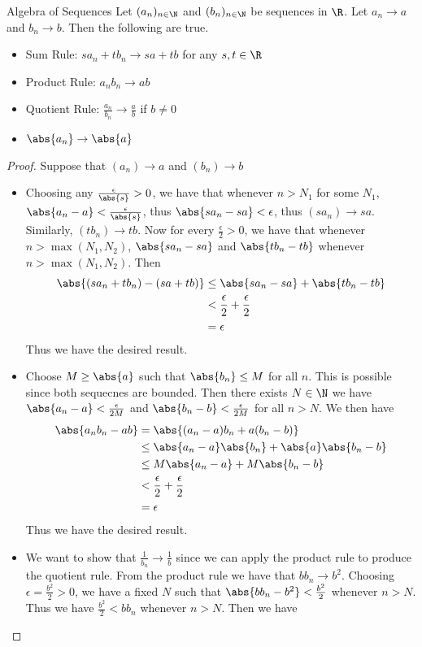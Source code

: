 \begin{prp}{Algebra of Sequences}{} Let $(a_n)_{n\in\N}$ and $(b_n)_{n\in\N}$ be sequences in $\R$. Let $a_n\to a$ and $b_n\to b$. Then the following are true. 
\begin{itemize}
\item Sum Rule: $sa_n+tb_n\to sa+tb$ for any $s,t\in\R$
\item Product Rule: $a_nb_n\to ab$
\item Quotient Rule: $\frac{a_n}{b_n}\to\frac{a}{b}$ if $b\neq 0$
\item $\abs{a_n}\to\abs{a}$
\end{itemize}\tcbline
\begin{proof} Suppose that $(a_n)\to a$ and $(b_n)\to b$
\begin{itemize}
\item Choosing any $\frac{\epsilon}{\abs{s}}>0$, we have that whenever $n>N_1$ for some $N_1$, $\abs{a_n-a}<\frac{\epsilon}{\abs{s}}$, thus $\abs{sa_n-sa}<\epsilon$, thus $(sa_n)\to sa$. Similarly, $(tb_n)\to tb$. Now for every $\frac{\epsilon}{2}>0$, we have that whenever $n>\max{(N_1,N_2)}$, $\abs{sa_n-sa}$ and $\abs{tb_n-tb}$ whenever $n>\max{(N_1,N_2)}$. Then 
\begin{align*}
\abs{(sa_n+tb_n)-(sa+tb)}&\leq\abs{sa_n-sa}+\abs{tb_n-tb} \\
&<\frac{\epsilon}{2}+\frac{\epsilon}{2} \\
&=\epsilon
\end{align*}
Thus we have the desired result. 
\item Choose $M\geq\abs{a}$ such that $\abs{b_n}\leq M$ for all $n$. This is possible since both sequecnes are bounded. Then there exists $N\in\N$ we have $\abs{a_n-a}<\frac{\epsilon}{2M}$ and $\abs{b_n-b}<\frac{\epsilon}{2M}$ for all $n>N$. We then have
\begin{align*}
\abs{a_nb_n-ab}&=\abs{(a_n-a)b_n+a(b_n-b)} \\
&\leq\abs{a_n-a}\abs{b_n}+\abs{a}\abs{b_n-b} \\
&\leq M\abs{a_n-a}+M\abs{b_n-b} \\
&<\frac{\epsilon}{2}+\frac{\epsilon}{2} \\
&=\epsilon
\end{align*}
Thus we have the desired result. 
\item We want to show that $\frac{1}{b_n}\to\frac{1}{b}$ since we can apply the product rule to produce the quotient rule. From the product rule we have that $bb_n\to b^2$. Choosing $\epsilon=\frac{b^2}{2}>0$, we have a fixed $N$ such that $\abs{bb_n-b^2}<\frac{b^2}{2}$ whenever $n>N$. Thus we have $\frac{b^2}{2}<bb_n$ whenever $n>N$. Then we have

\end{itemize}
\end{proof}
\end{prp}
